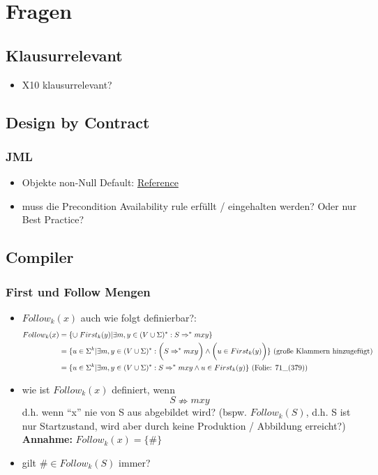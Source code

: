 \chapter{Fragen}
\section{Klausurrelevant}
\begin{itemize}
	\item X10 klausurrelevant?
\end{itemize}

\section{Design by Contract}
\subsection{JML}
\begin{itemize}
	\item Objekte non-Null Default: \href{http://www.eecs.ucf.edu/~leavens/JML/jmlrefman/jmlrefman_2.html#SEC16}{Reference}
	\item muss die Precondition Availability rule  erfüllt / eingehalten werden? Oder nur Best Practice?
\end{itemize}

\section{Compiler}
\subsection{First und Follow Mengen}
\begin{itemize}
	\item $Follow_k(x)$ auch wie folgt definierbar?:
		\begin{align*}
			Follow_k(x) &= \{ \cup\; First_k(y) | \exists m,y \in (V \cup \Sigma)^* : S \Rightarrow^* mxy \}\\
						&= \{ u \in \Sigma^k | \exists m,y \in (V \cup \Sigma)^*: \bigg(S \Rightarrow^* mxy\bigg) \wedge \bigg( u \in First_k(y) \bigg) \} \text{ (große Klammern hinzugefügt)}\\
						&= \{ u \in \Sigma^k | \exists m,y \in (V \cup \Sigma)^*: S \Rightarrow^* mxy \wedge u \in First_k(y) \} \text{ (Folie: $71\_\text{(379)}$)}
		\end{align*}
	\item wie ist $Follow_k(x)$ definiert, wenn 
		$$S \nRightarrow mxy$$
		d.h. wenn \enquote{x} nie von S aus abgebildet wird? (bspw. $Follow_k(S)$, d.h. S ist nur Startzustand, wird aber durch keine Produktion / Abbildung erreicht?)\\
		\textbf{Annahme:} $Follow_k(x) = \{ \# \}$
	\item gilt $\# \in Follow_k(S)$ immer?
\end{itemize}

